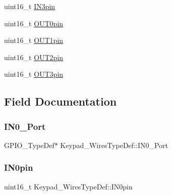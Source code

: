 \begin{DoxyCompactItemize}
\item 
uint16\+\_\+t \hyperlink{struct_keypad___wires_type_def_a3a5097701246b81b3156baf4a6e3fb5e}{I\+N3pin}
\item 
uint16\+\_\+t \hyperlink{struct_keypad___wires_type_def_ad84304a16a91fb587c994c959c30a39b}{O\+U\+T0pin}
\item 
uint16\+\_\+t \hyperlink{struct_keypad___wires_type_def_a49549ddf83137d8740537712453723ae}{O\+U\+T1pin}
\item 
uint16\+\_\+t \hyperlink{struct_keypad___wires_type_def_a376bc841372e03e107799eadf13cde51}{O\+U\+T2pin}
\item 
uint16\+\_\+t \hyperlink{struct_keypad___wires_type_def_aaaa4c6e2944f027f8c7eb8d8bc0ee90c}{O\+U\+T3pin}
\end{DoxyCompactItemize}


\subsection{Field Documentation}
\mbox{\label{struct_keypad___wires_type_def_a47955289b19390cde1cbc4c77f042369}} 
\subsubsection{\texorpdfstring{I\+N0\+\_\+\+Port}{IN0\_Port}}
{\footnotesize\ttfamily G\+P\+I\+O\+\_\+\+Type\+Def$\ast$ Keypad\+\_\+\+Wires\+Type\+Def\+::\+I\+N0\+\_\+\+Port}

\mbox{\label{struct_keypad___wires_type_def_a1982da4b510d015cde3d54a120d32461}} 
\subsubsection{\texorpdfstring{I\+N0pin}{IN0pin}}
{\footnotesize\ttfamily uint16\+\_\+t Keypad\+\_\+\+Wires\+Type\+Def\+::\+I\+N0pin}

\mbox{\label{struct_keypad___wires_type_def_acaa68d159d45a332a4932cd1b169d2ea}} 
